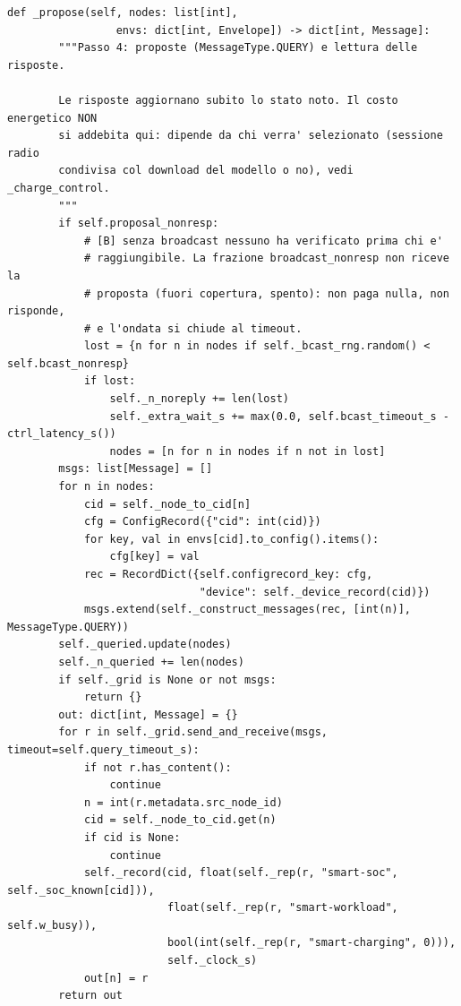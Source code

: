 \documentclass[11pt,a4paper]{article}
\begin{document}
\begin{lstlisting}[style=py,firstnumber=466,caption={\texttt{tesifl/strategies/sage\_smart.py}, lines 466--510}]
    def _propose(self, nodes: list[int],
                 envs: dict[int, Envelope]) -> dict[int, Message]:
        """Passo 4: proposte (MessageType.QUERY) e lettura delle risposte.

        Le risposte aggiornano subito lo stato noto. Il costo energetico NON
        si addebita qui: dipende da chi verra' selezionato (sessione radio
        condivisa col download del modello o no), vedi _charge_control.
        """
        if self.proposal_nonresp:
            # [B] senza broadcast nessuno ha verificato prima chi e'
            # raggiungibile. La frazione broadcast_nonresp non riceve la
            # proposta (fuori copertura, spento): non paga nulla, non risponde,
            # e l'ondata si chiude al timeout.
            lost = {n for n in nodes if self._bcast_rng.random() < self.bcast_nonresp}
            if lost:
                self._n_noreply += len(lost)
                self._extra_wait_s += max(0.0, self.bcast_timeout_s - ctrl_latency_s())
                nodes = [n for n in nodes if n not in lost]
        msgs: list[Message] = []
        for n in nodes:
            cid = self._node_to_cid[n]
            cfg = ConfigRecord({"cid": int(cid)})
            for key, val in envs[cid].to_config().items():
                cfg[key] = val
            rec = RecordDict({self.configrecord_key: cfg,
                              "device": self._device_record(cid)})
            msgs.extend(self._construct_messages(rec, [int(n)], MessageType.QUERY))
        self._queried.update(nodes)
        self._n_queried += len(nodes)
        if self._grid is None or not msgs:
            return {}
        out: dict[int, Message] = {}
        for r in self._grid.send_and_receive(msgs, timeout=self.query_timeout_s):
            if not r.has_content():
                continue
            n = int(r.metadata.src_node_id)
            cid = self._node_to_cid.get(n)
            if cid is None:
                continue
            self._record(cid, float(self._rep(r, "smart-soc", self._soc_known[cid])),
                         float(self._rep(r, "smart-workload", self.w_busy)),
                         bool(int(self._rep(r, "smart-charging", 0))),
                         self._clock_s)
            out[n] = r
        return out
\end{lstlisting}
\end{document}
